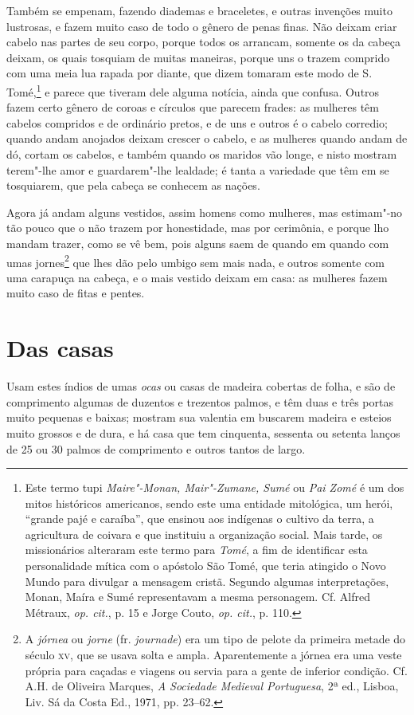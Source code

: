  Também se empenam, fazendo diademas e braceletes, e outras invenções
muito lustrosas, e fazem muito caso de todo o gênero de penas finas.
Não deixam criar cabelo nas partes de seu corpo, porque todos os
arrancam, somente os da cabeça deixam, os quais tosquiam de muitas
maneiras, porque uns o trazem comprido com uma meia lua rapada por
diante, que dizem tomaram este modo de S.\,Tomé,\footnote{ Este termo
tupi \textit{Maire"-Monan, Mair"-Zumane, Sumé} ou \textit{Pai Zomé} é um
dos mitos históricos americanos, sendo este uma entidade mitológica, um
herói, ``grande pajé e caraíba'', que ensinou aos indígenas o cultivo da
terra, a agricultura de coivara e que instituiu a organização social.
Mais tarde, os missionários alteraram este termo para \textit{Tomé}, a
fim de identificar esta personalidade mítica com o apóstolo São Tomé,
que teria atingido o Novo Mundo para divulgar a mensagem cristã.
Segundo algumas interpretações, Monan, Maíra e Sumé representavam a
mesma personagem. Cf. Alfred Métraux, \textit{op. cit.}, p. 15 e
Jorge Couto, \textit{op. cit.}, p. 110.} e parece que tiveram dele
alguma notícia, ainda que confusa. Outros fazem certo gênero de coroas
e círculos que parecem frades: as mulheres têm cabelos compridos e de
ordinário pretos, e de uns e outros é o cabelo corredio; quando andam
anojados deixam crescer o cabelo, e as mulheres quando andam de dó,
cortam os cabelos, e também quando os maridos vão longe, e nisto
mostram terem"-lhe amor e guardarem"-lhe lealdade; é tanta a variedade
que têm em se tosquiarem, que pela cabeça se conhecem as nações.

 Agora já andam alguns vestidos, assim homens como mulheres, mas
estimam"-no tão pouco que o não trazem por honestidade, mas por
cerimônia, e porque lho mandam trazer, como se vê bem, pois alguns
saem de quando em quando com umas jornes\footnote{ A \textit{jórnea} 
ou \textit{jorne} (fr. \textit{journade}) era um tipo
de pelote da primeira metade do século \textsc{xv}, que se usava solta e
ampla\textit{.} Aparentemente a jórnea era uma veste própria para
caçadas e viagens ou servia para a gente de inferior condição. Cf.
A.H. de Oliveira Marques, \textit{A Sociedade Medieval Portuguesa}, 2ª
ed., Lisboa, Liv. Sá da Costa Ed., 1971, pp. 23--62.} que lhes dão pelo
umbigo sem mais nada, e outros somente com uma carapuça na cabeça, e o
mais vestido deixam em casa: as mulheres fazem muito caso de fitas e pentes.

\section{Das casas}
Usam estes índios de umas \textit{ocas} ou casas de madeira
cobertas de folha, e são de comprimento algumas de duzentos e trezentos
palmos, e têm duas e três portas muito pequenas e baixas; mostram sua
valentia em buscarem madeira e esteios muito grossos e de dura, e há
casa que tem cinquenta, sessenta ou setenta lanços de 25 ou 30 palmos
de comprimento e outros tantos de largo.
 
